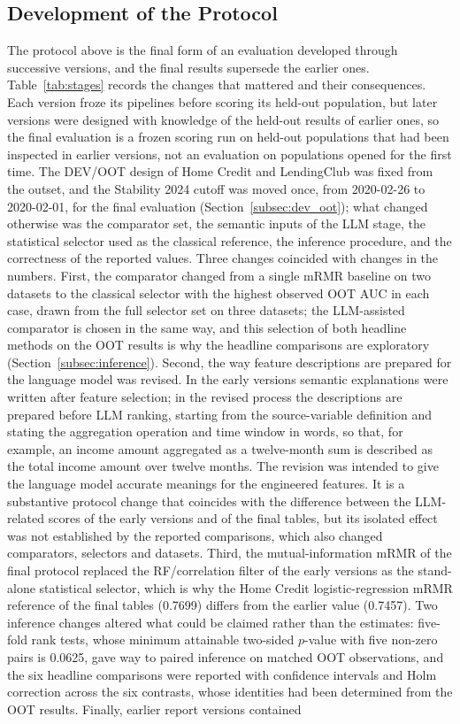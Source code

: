 \documentclass[final,5p,twocolumn]{elsarticle}
\begin{document}
\subsection{Development of the Protocol}
\label{subsec:protocol_development}

The protocol above is the final form of an evaluation developed through successive versions, and the final results supersede the earlier ones. Table~\ref{tab:stages} records the changes that mattered and their consequences. Each version froze its pipelines before scoring its held-out population, but later versions were designed with knowledge of the held-out results of earlier ones, so the final evaluation is a frozen scoring run on held-out populations that had been inspected in earlier versions, not an evaluation on populations opened for the first time. The DEV/OOT design of Home Credit and LendingClub was fixed from the outset, and the Stability 2024 cutoff was moved once, from 2020-02-26 to 2020-02-01, for the final evaluation (Section~\ref{subsec:dev_oot}); what changed otherwise was the comparator set, the semantic inputs of the LLM stage, the statistical selector used as the classical reference, the inference procedure, and the correctness of the reported values. Three changes coincided with changes in the numbers. First, the comparator changed from a single mRMR baseline on two datasets to the classical selector with the highest observed OOT AUC in each case, drawn from the full selector set on three datasets; the LLM-assisted comparator is chosen in the same way, and this selection of both headline methods on the OOT results is why the headline comparisons are exploratory (Section~\ref{subsec:inference}). Second, the way feature descriptions are prepared for the language model was revised. In the early versions semantic explanations were written after feature selection; in the revised process the descriptions are prepared before LLM ranking, starting from the source-variable definition and stating the aggregation operation and time window in words, so that, for example, an income amount aggregated as a twelve-month sum is described as the total income amount over twelve months. The revision was intended to give the language model accurate meanings for the engineered features. It is a substantive protocol change that coincides with the difference between the LLM-related scores of the early versions and of the final tables, but its isolated effect was not established by the reported comparisons, which also changed comparators, selectors and datasets. Third, the mutual-information mRMR of the final protocol replaced the RF/correlation filter of the early versions as the stand-alone statistical selector, which is why the Home Credit logistic-regression mRMR reference of the final tables (0.7699) differs from the earlier value (0.7457). Two inference changes altered what could be claimed rather than the estimates: five-fold rank tests, whose minimum attainable two-sided $p$-value with five non-zero pairs is 0.0625, gave way to paired inference on matched OOT observations, and the six headline comparisons were reported with confidence intervals and Holm correction across the six contrasts, whose identities had been determined from the OOT results. Finally, earlier report versions contained 
\end{document}
